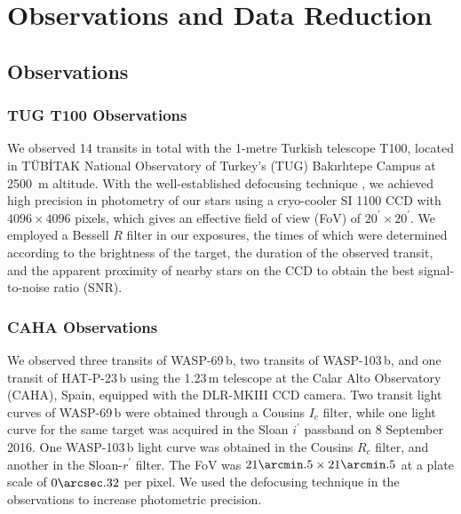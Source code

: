 \documentclass[a4paper,fleqn,usenatbib]{mnras}
\begin{document}
\section{Observations and Data Reduction}
\label{sec:observations_datared} %
\subsection{Observations}
\label{subsec:observations}
\subsubsection{TUG T100 Observations}
We observed 14 transits in total with the 1-metre Turkish telescope T100, located in T\"UB\.{I}TAK National Observatory of Turkey's (TUG) Bak{\i}rl{\i}tepe Campus at 2500~m altitude. With the well-established defocusing technique \citep{2009MNRAS.396.1023S, 2015ASPC..496..370B}, we achieved high precision in photometry of our stars using a cryo-cooler SI 1100 CCD with $4096\times4096$ pixels, which gives an effective field of view (FoV) of $20^{\prime}\times20^{\prime}$. We employed a Bessell $R$ filter in our exposures, the times of which were determined according to the brightness of the target, the duration of the observed transit, and the apparent proximity of nearby stars on the CCD to obtain the best signal-to-noise ratio (SNR).


\subsubsection{CAHA Observations}
We observed three transits of WASP-69\,b, two transits of WASP-103\,b, and one transit of HAT-P-23\,b using the 1.23\,m telescope at the Calar Alto Observatory (CAHA), Spain, equipped with the DLR-MKIII CCD camera. Two transit light curves of WASP-69\,b were obtained through a Cousins $I_c$ filter, while one light curve for the same target was acquired in the Sloan $i^{\prime}$ passband on 8 September 2016. One WASP-103\,b light curve was obtained in the Cousins $R_c$ filter, and another in the Sloan-$r^{\prime}$ filter. The FoV was $21\arcmin.5\times21\arcmin.5$ at a plate scale of $0\arcsec.32$ per pixel. We used the defocusing technique in the observations to increase photometric precision.
\end{document}
